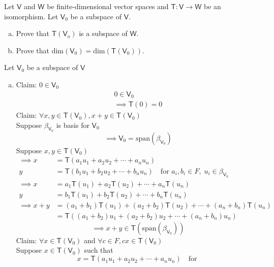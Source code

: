 Let $\mathsf{V}$ and $\mathsf{W}$ be finite-dimensional vector spaces
and $\mathsf{T}\colon \mathsf{V} \to \mathsf{W}$ be an
isomorphism. Let $\mathsf{V}_0$ be a subspace of $\mathsf{V}$.
\begin{enumerate}[(a)]
\item Prove that $\mathsf{T}(\mathsf{V}_o)$ is a subspace of
  $\mathsf{W}$.
\item Prove that $\text{dim}(\mathsf{V}_0) = \text{dim}(\mathsf{T}(\mathsf{V}_0))$.
\end{enumerate}
Let $\mathsf{V}_0$ be a subspace of $\mathsf{V}$ 
\begin{enumerate}[(a)]
\item Claim: $0 \in \mathsf{V}_0$
\begin{gather}
0 \in \mathsf{V}_0\\
\implies \mathsf{T}(0) = 0 
\end{gather}
Claim: $\forall x , y \in \mathsf{T}(\mathsf{V}_0), x + y \in
\mathsf{T}(\mathsf{V}_0)$
\\Suppose $\beta_{\mathsf{V}_0}$ is basis for $\mathsf{V}_0$
\begin{equation}
\implies \mathsf{V}_0 = \text{span}(\beta_{\mathsf{V}_0})
\end{equation}
Suppose $x, y \in \mathsf{T}(\mathsf{V}_0)$
\begin{align}
\implies x &= \mathsf{T}(a_1u_1 + a_2u_2 + \dotsb + a_nu_n)\\
y &= \mathsf{T}(b_1u_1 + b_2u_2 + \dotsb + b_nu_n) \quad \text{for }
a_i,b_i \in F, \; u_i \in \beta_{\mathsf{V}_0}\\
\implies x &= a_1\mathsf{T}(u_1) + a_2\mathsf{T}(u_2) + \dotsb +
a_n\mathsf{T}(u_n)\\
y &= b_1\mathsf{T}(u_1) + b_2\mathsf{T}(u_2) +\dotsb +
b_n\mathsf{T}(u_n)\\
\implies x +y &= (a_1+b_1)\mathsf{T}(u_1) + (a_2 +b_2)\mathsf{T}(u_2) +
\dotsb + (a_n+b_n)\mathsf{T}(u_n)\\
&= \mathsf{T}((a_1 +b_2)u_1 + (a_2+b_2)u_2 + \dotsb + (a_n + b_n)u_n)
\end{align}
\begin{equation}
\implies x + y \in \mathsf{T}(\text{span}(\beta_{\mathsf{V}_0}))
\end{equation}
Claim: $\forall x \in \mathsf{T}(\mathsf{V}_0)$ and $\forall c \in F,
cx \in \mathsf{T}(\mathsf{V}_0)$
\\Suppose $x \in \mathsf{T}(\mathsf{V}_0)$ such that
\begin{equation}
x = \mathsf{T}(a_1u_1 + a_2u_2 + \dotsb + a_nu_n)\quad \text{for }

\end{equation}
\end{enumerate}
